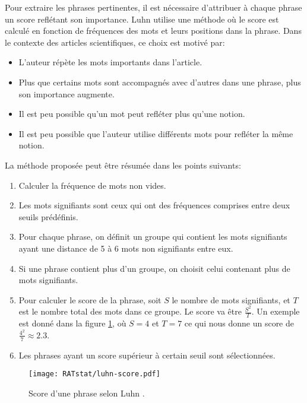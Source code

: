 \documentclass[a4paper,12pt,oneside]{../use/ESIthesis}
\begin{document}
Pour extraire les phrases pertinentes, il est nécessaire d'attribuer à chaque phrase un score reflétant son importance. 
Luhn utilise une méthode où le score est calculé en fonction de fréquences des mots et leurs positions dans la phrase. 
Dans le contexte des articles scientifiques, ce choix est motivé par:
\begin{itemize}
\item L'auteur répète les mots importants dans l'article. 
\item Plus que certains mots sont accompagnés avec d'autres dans une phrase, plus son importance augmente. 
\item Il est peu possible qu'un mot peut refléter plus qu'une notion. 
\item Il est peu possible que l'auteur utilise différents mots pour refléter la même notion. 
\end{itemize}

La méthode proposée peut être résumée dans les points suivants:
\begin{enumerate}
\item Calculer la fréquence de mots non vides. 
\item Les mots signifiants sont ceux qui ont des fréquences comprises entre deux seuils prédéfinis. 
\item Pour chaque phrase, on définit un groupe qui contient les mots signifiants ayant une distance de 5 à 6 mots non signifiants entre eux. 
\item Si une phrase contient plus d'un groupe, on choisit celui contenant plus de mots signifiants. 
\item Pour calculer le score de la phrase, soit $ S $ le nombre de mots signifiants, et $ T $ est le nombre total des mots dans ce groupe. 
Le score va être $ \frac{S^2}{T} $. 
Un exemple est donné dans la figure \ref{fig:luhn-score}, où $ S = 4 $ et $ T = 7 $ ce qui nous donne un score de $ \frac{4^2}{7} \approx 2.3  $.
\item Les phrases ayant un score supérieur à certain seuil sont sélectionnées. 
\end{enumerate}

\begin{figure}[ht]
\begin{center}
\texttt{[image: RATstat/luhn-score.pdf]} %
 \caption[Score d'une phrase selon Luhn]{Score d'une phrase selon Luhn \cite{58-luhn}.}
 \label{fig:luhn-score}
\end{center}
\end{figure}
\end{document}
